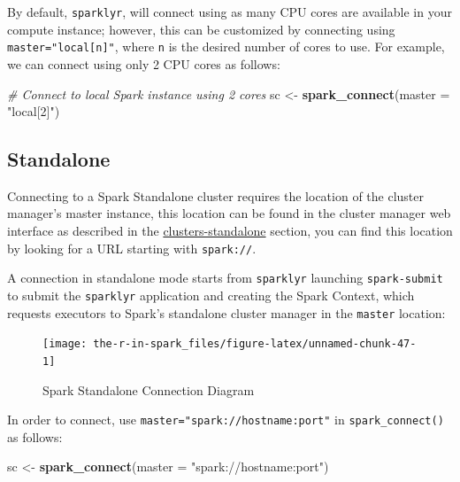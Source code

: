 \documentclass[]{book}
\newenvironment{Shaded}{\begin{snugshade}}{\end{snugshade}}
\newcommand{\CommentTok}[1]{\textcolor[rgb]{0.56,0.35,0.01}{\textit{#1}}}
\newcommand{\DataTypeTok}[1]{\textcolor[rgb]{0.13,0.29,0.53}{#1}}
\newcommand{\KeywordTok}[1]{\textcolor[rgb]{0.13,0.29,0.53}{\textbf{#1}}}
\newcommand{\NormalTok}[1]{#1}
\newcommand{\StringTok}[1]{\textcolor[rgb]{0.31,0.60,0.02}{#1}}
\theoremstyle{definition}
\theoremstyle{definition}
\theoremstyle{definition}
\theoremstyle{remark}
\begin{document}
By default, \texttt{sparklyr}, will connect using as many CPU cores are
available in your compute instance; however, this can be customized by
connecting using \texttt{master="local{[}n{]}"}, where \texttt{n} is the
desired number of cores to use. For example, we can connect using only 2
CPU cores as follows:

\begin{Shaded}
\begin{Highlighting}[]
\CommentTok{# Connect to local Spark instance using 2 cores}
\NormalTok{sc <-}\StringTok{ }\KeywordTok{spark_connect}\NormalTok{(}\DataTypeTok{master =} \StringTok{"local[2]"}\NormalTok{)}
\end{Highlighting}
\end{Shaded}

\hypertarget{standalone}{%
\subsection{Standalone}\label{standalone}}

Connecting to a Spark Standalone cluster requires the location of the
cluster manager's master instance, this location can be found in the
cluster manager web interface as described in the
\href{standalone\%20cluster}{clusters-standalone} section, you can find
this location by looking for a URL starting with \texttt{spark://}.

A connection in standalone mode starts from \texttt{sparklyr} launching
\texttt{spark-submit} to submit the \texttt{sparklyr} application and
creating the Spark Context, which requests executors to Spark's
standalone cluster manager in the \texttt{master} location:

\begin{figure}

{\centering \texttt{[image: the-r-in-spark\_files/figure-latex/unnamed-chunk-47-1]} 

}

\caption{Spark Standalone Connection Diagram}\label{fig:unnamed-chunk-47}
\end{figure}

In order to connect, use \texttt{master="spark://hostname:port"} in
\texttt{spark\_connect()} as follows:

\begin{Shaded}
\begin{Highlighting}[]
\NormalTok{sc <-}\StringTok{ }\KeywordTok{spark_connect}\NormalTok{(}\DataTypeTok{master =} \StringTok{"spark://hostname:port"}\NormalTok{)}
\end{Highlighting}
\end{Shaded}
\end{document}
